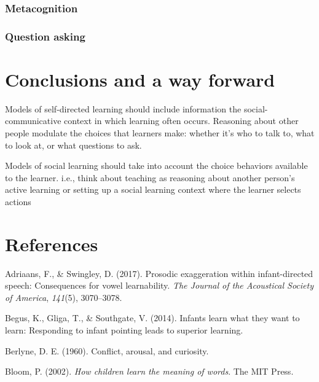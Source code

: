 \documentclass[a4paper,man,apacite,floatsintext]{apa6}
\begin{document}
\subsubsection{Metacognition}\label{metacognition}

\subsubsection{Question asking}\label{question-asking}

\section{Conclusions and a way
forward}\label{conclusions-and-a-way-forward}

Models of self-directed learning should include information the
social-communicative context in which learning often occurs. Reasoning
about other people modulate the choices that learners make: whether it's
who to talk to, what to look at, or what questions to ask.

Models of social learning should take into account the choice behaviors
available to the learner. i.e., think about teaching as reasoning about
another person's active learning or setting up a social learning context
where the learner selects actions

\newpage

\section{References}\label{references}

\setlength{\parindent}{-0.4in} \setlength{\leftskip}{0.125in} \noindent

\hypertarget{refs}{}
\hypertarget{ref-adriaans2017prosodic}{}
Adriaans, F., \& Swingley, D. (2017). Prosodic exaggeration within
infant-directed speech: Consequences for vowel learnability. \emph{The
Journal of the Acoustical Society of America}, \emph{141}(5),
3070--3078.

\hypertarget{ref-begus2014infants}{}
Begus, K., Gliga, T., \& Southgate, V. (2014). Infants learn what they
want to learn: Responding to infant pointing leads to superior learning.

\hypertarget{ref-berlyne1960conflict}{}
Berlyne, D. E. (1960). Conflict, arousal, and curiosity.

\hypertarget{ref-bloom2002children}{}
Bloom, P. (2002). \emph{How children learn the meaning of words}. The
MIT Press.
\end{document}
